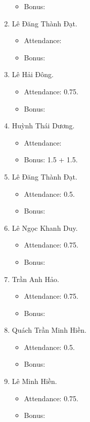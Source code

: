 \documentclass{article}
\begin{document}
\begin{enumerate}
\begin{itemize}
        \item Bonus:
    \end{itemize}
    \item {\sc Lê Đăng Thành Đạt.}
    \begin{itemize}
        \item Attendance:
        \item Bonus:
    \end{itemize}
    \item {\sc Lê Hải Đông.}
    \begin{itemize}
        \item Attendance: 0.75.
        \item Bonus:
    \end{itemize}
    \item {\sc Huỳnh Thái Dương.}
    \begin{itemize}
        \item Attendance:
        \item Bonus: 1.5 + 1.5.
    \end{itemize}
    \item {\sc Lê Đăng Thành Đạt.}
    \begin{itemize}
        \item Attendance: 0.5.
        \item Bonus:
    \end{itemize}
    \item {\sc Lê Ngọc Khanh Duy.}
    \begin{itemize}
        \item Attendance: 0.75.
        \item Bonus:
    \end{itemize}
    \item {\sc Trần Anh Hảo.}
    \begin{itemize}
        \item Attendance: 0.75.
        \item Bonus:
    \end{itemize}
    \item {\sc Quách Trần Minh Hiền.}
    \begin{itemize}
        \item Attendance: 0.5.
        \item Bonus:
    \end{itemize}
    \item {\sc Lê Minh Hiền.}
    \begin{itemize}
        \item Attendance: 0.75.
        \item Bonus:

\end{itemize}
\end{enumerate}
\end{document}
